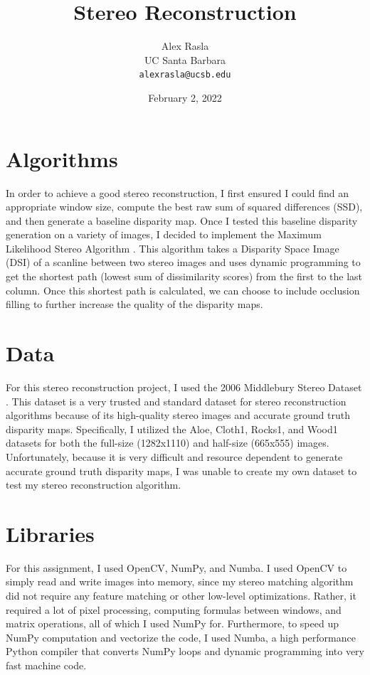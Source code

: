 \documentclass[11pt,a4paper]{article}
\title{Stereo Reconstruction}
\author{Alex Rasla \\
  UC Santa Barbara \\
  \texttt{alexrasla@ucsb.edu}}
\date{February 2, 2022}
\begin{document}
\maketitle

\section{Algorithms}

In order to achieve a good stereo reconstruction, I first ensured I could find an appropriate 
 window size, compute the best raw sum of squared differences (SSD), and then generate a baseline disparity map. 
 Once I tested this baseline disparity generation on a variety of images, I decided to implement the Maximum Likelihood Stereo 
 Algorithm \cite{COX1996542}. This algorithm takes a Disparity Space Image (DSI) of a scanline between two stereo images and 
 uses dynamic programming to get the shortest path (lowest sum of dissimilarity scores) from the first to the last column. 
 Once this shortest path is calculated, we can choose to include occlusion filling to further increase the quality of the disparity maps.

\section{Data}

For this stereo reconstruction project, I used the 2006 Middlebury Stereo Dataset \cite{Hirschmller2007EvaluationOC}. 
 This dataset is a very trusted and standard dataset for stereo reconstruction algorithms because of its high-quality stereo 
 images and accurate ground truth disparity maps. Specifically, I utilized the Aloe, Cloth1, Rocks1, and Wood1 datasets for 
 both the full-size (1282x1110) and half-size (665x555) images.  Unfortunately, because it is very difficult and resource 
 dependent to generate accurate ground truth disparity maps, I was unable to create my own dataset to test my stereo reconstruction 
 algorithm.

\section{Libraries}

For this assignment, I used OpenCV, NumPy, and Numba. I used OpenCV to simply read and write images into memory, since my stereo matching algorithm did not require any feature matching or other low-level optimizations. Rather, it required a lot of pixel processing, computing formulas between windows, and matrix operations, all of which I used NumPy for. Furthermore, to speed up NumPy computation and vectorize the code, I used Numba, a high performance Python compiler that converts NumPy loops and dynamic programming into very fast machine code.
\end{document}
